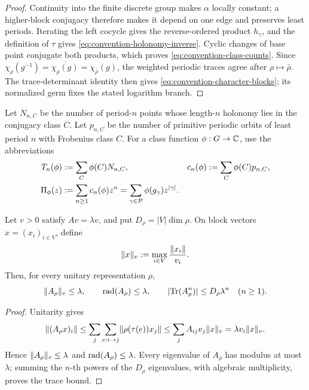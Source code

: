 \begin{proof}
Continuity into the finite discrete group makes \(\alpha\) locally constant;
a higher-block conjugacy therefore makes it depend on one edge and preserves
least periods.  Iterating the left cocycle gives the reverse-ordered product
\(h_\gamma\), and the definition of \(\tau\) gives
\eqref{eq:convention-holonomy-inverse}.  Cyclic changes of base point conjugate
both products, which proves \eqref{eq:convention-class-counts}.  Since
\(\chi_\rho(g^{-1})=\overline{\chi_\rho(g)}=\chi_{\bar\rho}(g)\), the weighted
periodic traces agree after \(\rho\mapsto\bar\rho\).  The trace-determinant
identity then gives \eqref{eq:convention-character-blocks}; its normalized
germ fixes the stated logarithm branch.
\end{proof}

Let \(N_{n,C}\) be the number of period-\(n\) points whose length-\(n\)
holonomy lies in the conjugacy class \(C\).  Let \(p_{n,C}\) be the number of
primitive periodic orbits of least period \(n\) with Frobenius class \(C\).
For a class function \(\phi:G\to\mathbb{C}\), use the abbreviations
\begin{align}
  T_n(\phi)&:=\sum_C\phi(C)N_{n,C},
  &c_n(\phi)&:=\sum_C\phi(C)p_{n,C},\label{eq:weighted-counts}\\
  \Pi_\phi(z)&:=\sum_{n\geq1}c_n(\phi)z^n
  =\sum_{\gamma\in\mathcal P}\phi(g_\gamma)z^{|\gamma|}.
  \label{eq:primitive-channel}
\end{align}

\begin{lemma}
\label{lem:perron-weighted-domination}
Let \(v>0\) satisfy \(Av=\lambda v\), and put
\(D_\rho=|V|\dim\rho\).  On block vectors \(x=(x_i)_{i\in V}\), define
\[
  \lVert x \rVert_v:=\max_{i\in V}\frac{\lVert x_i \rVert}{v_i}.
\]
Then, for every unitary representation \(\rho\),
\begin{equation}\label{eq:perron-weighted-block-bound}
  \lVert A_\rho \rVert_v\le\lambda,
  \qquad \operatorname{rad}(A_\rho)\le\lambda,
  \qquad \lvert \operatorname{Tr}(A_\rho^n) \rvert\le D_\rho\lambda^n
  \quad(n\ge1).
\end{equation}
\end{lemma}

\begin{proof}
Unitarity gives
\[
 \lVert (A_\rho x)_i \rVert
 \le \sum_j\sum_{e:i\to j}\lVert \rho(\tau(e))x_j \rVert
 \le \sum_j A_{ij}v_j\lVert x \rVert_v
 =\lambda v_i\lVert x \rVert_v.
\]
Hence \(\lVert A_\rho \rVert_v\le\lambda\) and
\(\operatorname{rad}(A_\rho)\le\lambda\).  Every eigenvalue of \(A_\rho\) has modulus at
most \(\lambda\); summing the \(n\)-th powers of the \(D_\rho\) eigenvalues,
with algebraic multiplicity, proves the trace bound.
\end{proof}

